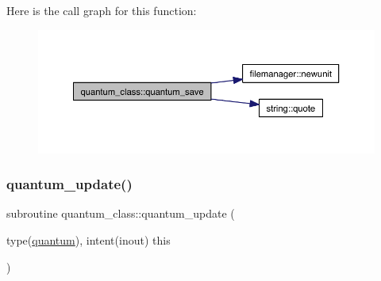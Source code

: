 Here is the call graph for this function\+:\nopagebreak
\begin{figure}[H]
\begin{center}
\leavevmode
\includegraphics[width=350pt]{namespacequantum__class_aa60138cf5e19494d1f29b63053b32f24_cgraph}
\end{center}
\end{figure}
\mbox{\label{namespacequantum__class_afef9cff48e6cd580f47a06f4adc4109b}} 
\subsubsection{\texorpdfstring{quantum\+\_\+update()}{quantum\_update()}}
{\footnotesize\ttfamily subroutine quantum\+\_\+class\+::quantum\+\_\+update (\begin{DoxyParamCaption}\item[{type(\hyperlink{structquantum__class_1_1quantum}{quantum}), intent(inout)}]{this }\end{DoxyParamCaption})\hspace{0.3cm}{\ttfamily [private]}}

